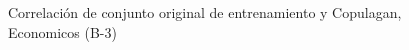 \begin{figure}[H]
    \centering
    
    \caption{Correlación de conjunto original de entrenamiento y Copulagan, Economicos (B-3)}
    \label{pairwise-economicos-b-3-copulagan}
\end{figure}
